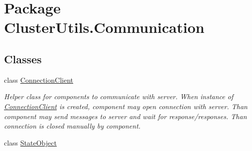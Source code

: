 \hypertarget{namespace_cluster_utils_1_1_communication}{}\section{Package Cluster\+Utils.\+Communication}
\label{namespace_cluster_utils_1_1_communication}
\subsection*{Classes}
\begin{DoxyCompactItemize}
\item 
class \hyperlink{class_cluster_utils_1_1_communication_1_1_connection_client}{Connection\+Client}
\begin{DoxyCompactList}\small\item\em Helper class for components to communicate with server. When instance of \hyperlink{class_cluster_utils_1_1_communication_1_1_connection_client}{Connection\+Client} is created, component may open connection with server. Than component may send messages to server and wait for response/responses. Than connection is closed manually by component. \end{DoxyCompactList}\item 
class \hyperlink{class_cluster_utils_1_1_communication_1_1_state_object}{State\+Object}
\end{DoxyCompactItemize}
